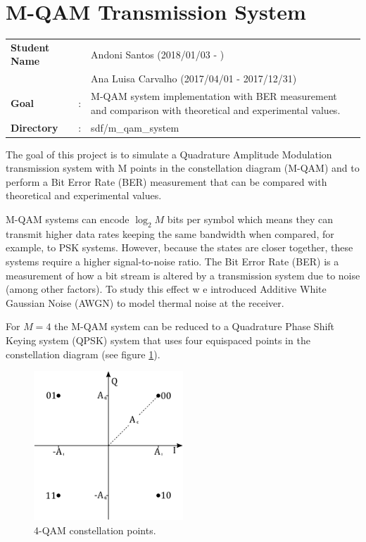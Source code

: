 \clearpage
\section{M-QAM Transmission System}

\setcounter{tocdepth}{3}		
\setcounter{secnumdepth}{3}

\begin{refsection}

\begin{tcolorbox}
	\begin{tabular}{p{2.75cm} p{0.2cm} p{10.5cm}}
		\textbf{Student Name}  & & Andoni Santos (2018/01/03 - )\\
							   & & Ana Luisa Carvalho (2017/04/01 - 2017/12/31) \\
		\textbf{Goal}          &:& M-QAM system implementation with BER measurement and comparison with theoretical and experimental values.\\
		\textbf{Directory} &:& sdf/m\_qam\_system
	\end{tabular}
\end{tcolorbox}

The goal of this project is to simulate a Quadrature Amplitude Modulation transmission system with M points in the constellation diagram (M-QAM) and to perform a Bit Error Rate (BER) measurement that can be compared with theoretical and experimental values.

M-QAM systems can encode $\log_2 M$ bits per symbol which means they can
transmit higher data rates keeping the same bandwidth when compared, for
example, to PSK systems. However, because the states are closer together, these
systems require a higher signal-to-noise ratio.
The Bit Error Rate (BER) is a measurement of how a bit stream is altered by a transmission system due to noise (among other factors). To study this effect w	e introduced Additive White Gaussian Noise (AWGN) to model thermal noise at the receiver.

For $M=4$ the M-QAM system can be reduced to a Quadrature Phase Shift Keying system (QPSK) system that uses four equispaced points in the constellation diagram (see figure \ref{fig:const}).

\begin{figure}[h]
	\centering
	\includegraphics[width=0.5\textwidth]{./sdf/m_qam_system/figures/constellation.pdf}
	\caption{4-QAM constellation points.}
	\label{fig:const}
\end{figure}


\end{refsection}
